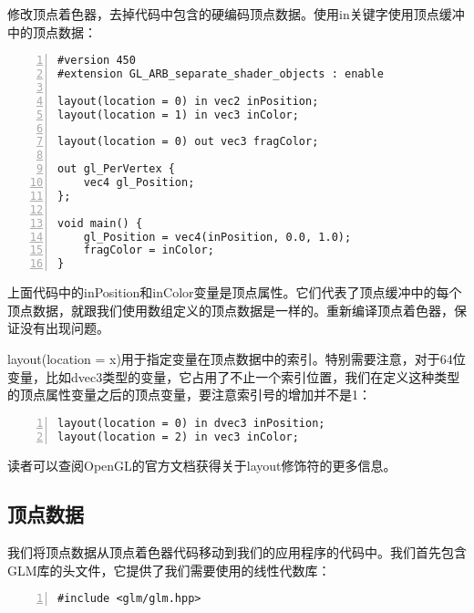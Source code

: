 \documentclass{ctexart}
\begin{document}
修改顶点着色器，去掉代码中包含的硬编码顶点数据。使用in关键字使用顶点缓冲中的顶点数据：

\begin{lstlisting}[language={[ANSI]C},keywordstyle=\color{blue!70},commentstyle=\color{red!50!green!50!blue!50},frame=shadowbox, rulesepcolor=\color{red!20!green!20!blue!20},basicstyle=\small,numbers=left, numberstyle=\tiny,breaklines=true]
#version 450
#extension GL_ARB_separate_shader_objects : enable

layout(location = 0) in vec2 inPosition;
layout(location = 1) in vec3 inColor;

layout(location = 0) out vec3 fragColor;

out gl_PerVertex {
	vec4 gl_Position;
};

void main() {
	gl_Position = vec4(inPosition, 0.0, 1.0);
	fragColor = inColor;
}
\end{lstlisting}

上面代码中的inPosition和inColor变量是顶点属性。它们代表了顶点缓冲中的每个顶点数据，就跟我们使用数组定义的顶点数据是一样的。重新编译顶点着色器，保证没有出现问题。

layout(location = x)用于指定变量在顶点数据中的索引。特别需要注意，对于64位变量，比如dvec3类型的变量，它占用了不止一个索引位置，我们在定义这种类型的顶点属性变量之后的顶点变量，要注意索引号的增加并不是1：

\begin{lstlisting}[language={[ANSI]C},keywordstyle=\color{blue!70},commentstyle=\color{red!50!green!50!blue!50},frame=shadowbox, rulesepcolor=\color{red!20!green!20!blue!20},basicstyle=\small,numbers=left, numberstyle=\tiny,breaklines=true]
layout(location = 0) in dvec3 inPosition;
layout(location = 2) in vec3 inColor;
\end{lstlisting}

读者可以查阅OpenGL的官方文档获得关于layout修饰符的更多信息。

\subsection{顶点数据}

我们将顶点数据从顶点着色器代码移动到我们的应用程序的代码中。我们首先包含GLM库的头文件，它提供了我们需要使用的线性代数库：

\begin{lstlisting}[language={[ANSI]C},keywordstyle=\color{blue!70},commentstyle=\color{red!50!green!50!blue!50},frame=shadowbox, rulesepcolor=\color{red!20!green!20!blue!20},basicstyle=\small,numbers=left, numberstyle=\tiny,breaklines=true]
#include <glm/glm.hpp>
\end{lstlisting}
\end{document}
